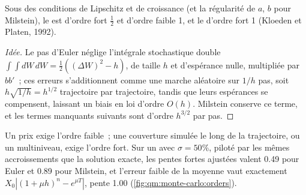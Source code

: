 \begin{proposition}\label{prop:qm:monte-carlo:orders}
Sous des conditions de Lipschitz et de croissance (et la régularité de $a$, $b$ pour Milstein), le  est d'ordre fort $\frac12$ et d'ordre faible 1, et le  d'ordre fort 1
(Kloeden et Platen, 1992).
\end{proposition}

\begin{proof}[Idée]
Le pas d'Euler néglige l'intégrale stochastique double $\int\!\!\int dW\,dW = \frac12((\Delta W)^2 - h)$, de taille $h$ et d'espérance nulle, multipliée par $bb'$~; ces erreurs s'additionnent comme une marche aléatoire sur $1/h$
pas, soit $h\sqrt{1/h} = h^{1/2}$ trajectoire par trajectoire, tandis que leurs espérances se compensent, laissant un biais en loi d'ordre $O(h)$. Milstein conserve ce terme, et les termes manquants suivants sont d'ordre $h^{3/2}$ par pas.
\end{proof}

Un prix exige l'ordre faible~; une couverture simulée le long de la trajectoire, ou un  multiniveau, exige l'ordre fort. Sur un  avec $\sigma = 50\%$, piloté par les mêmes accroissements que
la solution exacte, les pentes fortes ajustées valent 0.49 pour Euler et 0.89 pour Milstein, et l'erreur faible de la moyenne vaut exactement $X_0|(1 + \mu h)^n - e^{\mu T}|$, pente 1.00
(\cref{fig:qm:monte-carlo:orders}).


